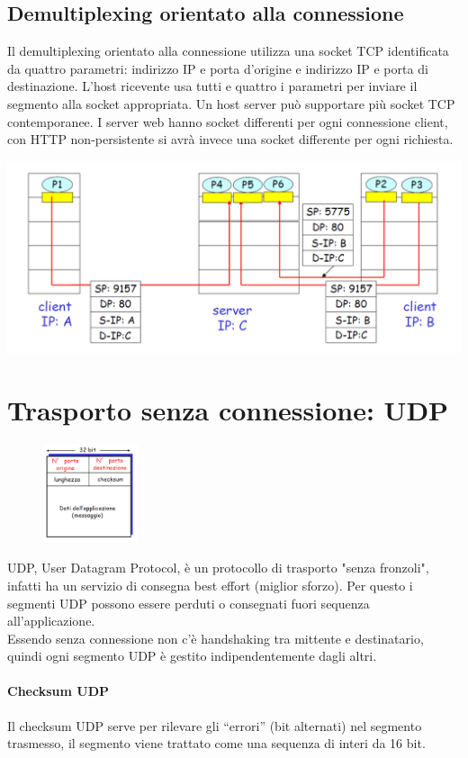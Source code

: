 \documentclass{report}
\begin{document}
	\subsection{Demultiplexing orientato alla connessione}
	Il demultiplexing orientato alla connessione utilizza una socket TCP identificata da quattro parametri: indirizzo IP e porta d'origine e indirizzo IP e porta di destinazione. L'host ricevente usa tutti e quattro i parametri per inviare il segmento alla socket appropriata. Un host server può supportare più socket TCP contemporanee. I server web hanno socket differenti per ogni connessione client, con HTTP non-persistente si avrà invece una socket differente per ogni richiesta.
	\begin{center}
		\includegraphics[width=0.7\linewidth]{socket-tcp}
	\end{center}
	\section{Trasporto senza connessione: UDP}
	\begin{figure}
		\centering
		\vspace{-30pt}
		\includegraphics[width=0.25\textwidth]{segmento-udp}
		\vspace{-30pt}
	\end{figure}

	UDP, User Datagram Protocol, è un protocollo di trasporto "senza fronzoli", infatti ha un servizio di consegna best effort (miglior sforzo). Per questo i segmenti UDP possono essere perduti o consegnati fuori sequenza all'applicazione.\medskip\\ Essendo senza connessione non c'è handshaking tra mittente e destinatario, quindi ogni segmento UDP è gestito indipendentemente dagli altri.
	\paragraph{Checksum UDP} Il checksum UDP serve per rilevare gli “errori” (bit alternati) nel segmento trasmesso, il segmento viene trattato come una sequenza di interi da 16 bit.
	
	
	
	
	
	
	
	
	
	
	
	
	
	
	
	
	
	
	
\end{document}
